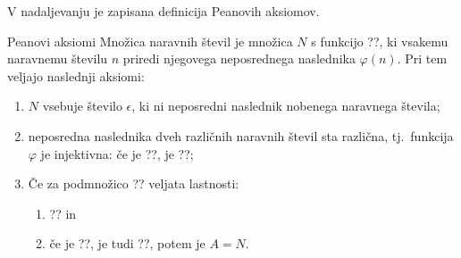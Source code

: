 \documentclass[a4paper, 11pt]{article}
\newcommand{\N}{N}
\begin{document}
        V nadaljevanju je zapisana definicija Peanovih aksiomov.

        Peanovi aksiomi
        Množica naravnih števil je množica $\N$ s funkcijo ??, 
        ki vsakemu naravnemu številu $n$ priredi njegovega neposrednega naslednika $\varphi(n)$. 
        Pri tem veljajo naslednji aksiomi:
        \begin{enumerate}
            \item $\N$ vsebuje število $\epsilon$, ki ni neposredni naslednik nobenega naravnega števila;
            \item neposredna naslednika dveh različnih naravnih števil sta različna, tj.\ funkcija $\varphi$ je injektivna: 
            če je ??, je ??;
            \item Če za podmnožico ?? veljata lastnosti:
            \begin{enumerate}
                \item ?? in
                \item če je ??, je tudi ??,
                potem je $A = \N$.
            \end{enumerate}
        \end{enumerate}

    
\end{document}
